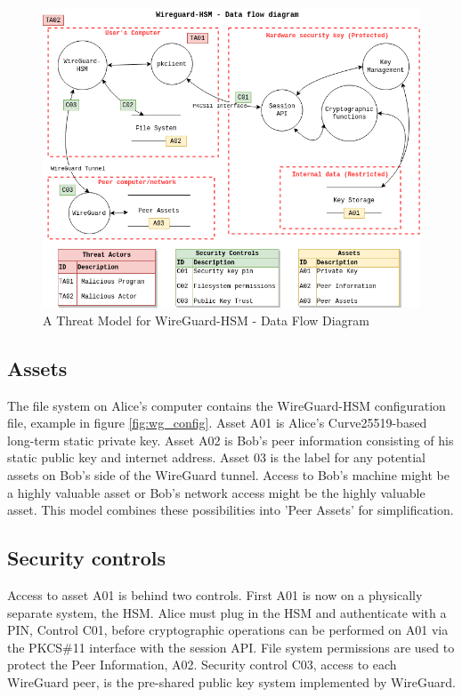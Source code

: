 \documentclass [11pt, proquest] {uwthesis}[2020/02/24]
\begin{document}
\begin{figure}[H]
\includegraphics[width=14cm]{paper/images/WGHSM_DFD.png}
\caption{A Threat Model for WireGuard-HSM - Data Flow Diagram}
\label{fig:wg_hsm_dfd}
\end{figure}

\subsection{Assets}
The file system on Alice's computer contains the WireGuard-HSM configuration file, example in figure \ref{fig:wg_config}. 
Asset A01 is Alice's Curve25519-based long-term static private key. Asset A02 is Bob's peer information consisting of his static public key and internet address.
Asset 03 is the label for any potential assets on Bob's side of the WireGuard tunnel. Access to Bob's machine might be a highly valuable asset or Bob's network access might be the highly valuable asset. This model combines these possibilities into 'Peer Assets' for simplification.

\subsection{Security controls}
Access to asset A01 is behind two controls. First A01 is now on a physically separate system, the HSM. Alice must plug in the HSM and authenticate with a PIN, Control C01, before cryptographic operations can be performed on A01 via the PKCS\#11 interface with the session API.
File system permissions are used to protect the Peer Information, A02.
Security control C03, access to each WireGuard peer, is the pre-shared public key system implemented by WireGuard.
\end{document}

